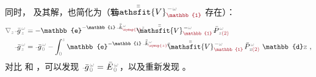 同时， 及其解，也简化为（若 $\Xint{\mathcolor{gray}{-}}{25}{\bar{\bar{\mathsfit{V}}}}^{\;\! - \mathcolor{gray}{\omega}}_{\textcolor{Maroon}{\mathbb{1}}}$ 存在）：
\begin{subequations} \label{eq:simplify6-LE0-SVA-E'-V_1nonsingular-gg}
\begin{align}
	\mathcolor{gray}{\nabla_z} \Xint{{}^{}_{\mathcolor{gray}{-}}}{10}{\bar{g}}^{\;\!\mathcolor{gray}{\omega}}_{\;\! \mathcolor{gray}{z}}
	&= - \mathbb{e}^{-\mathbb{i} \Xint{\begin{smallmatrix} ~ \\ {}^{}_{\mathcolor{gray}{-}} \\ ~ \end{smallmatrix}}{15}{\bar{\bar{k}}}_{\textcolor{Maroon}{\symup{z}}}^{\;\! \mathcolor{gray}{\omega}} \mathcolor{gray}{z}} \Xint{\mathcolor{gray}{-}}{25}{\bar{\bar{\mathsfit{V}}}}^{\;\! - \mathcolor{gray}{\omega}}_{\textcolor{Maroon}{\mathbb{1}}} \Xint{\mathcolor{gray}{-}}{30}{\bar{P}}^{\;\! \mathcolor{gray}{\omega}}_{\;\! \mathcolor{gray}{z} \textcolor{Maroon}{(2)}} \label{eq:simplify6-LE0-SVA-E'-V_1nonsingular-g} \\
	\Xint{{}^{}_{\mathcolor{gray}{-}}}{10}{\bar{g}}^{\;\!\mathcolor{gray}{\omega}}_{\;\! \mathcolor{gray}{z}}
	&= \Xint{{}^{}_{\mathcolor{gray}{-}}}{10}{\bar{g}}^{\;\!\mathcolor{gray}{\omega}}_{\;\! \mathcolor{gray}{0}} - \int_{\mathcolor{gray}{0}}^{\mathcolor{gray}{z}} \mathbb{e}^{- \mathbb{i} \Xint{\begin{smallmatrix} ~ \\ {}^{}_{\mathcolor{gray}{-}} \\ ~ \end{smallmatrix}}{15}{\bar{\bar{k}}}_{\textcolor{Maroon}{\symup{z}}}^{\;\! \mathcolor{gray}{\omega}} \mathcolor{gray}{\mathtt{z}}} \cdot \Xint{\mathcolor{gray}{-}}{25}{\bar{\bar{\mathsfit{V}}}}^{\;\! - \mathcolor{gray}{\omega}}_{\textcolor{Maroon}{\mathbb{1}}} \Xint{\mathcolor{gray}{-}}{30}{\bar{P}}^{\;\! \mathcolor{gray}{\omega}}_{\;\! \mathcolor{gray}{\mathtt{z}} \textcolor{Maroon}{(2)}} ~\mathbb{d} \mathcolor{gray}{\mathtt{z}} ~,  \label{eq:simplify6-LE0-SVA-E'-V_1nonsingular-solution-g}
\end{align}
\end{subequations}
对比  和 ，可以发现 $\Xint{{}^{}_{\mathcolor{gray}{-}}}{10}{\bar{g}}^{\;\!\mathcolor{gray}{\omega}}_{\;\! \mathcolor{gray}{0}} = \Xint{\mathcolor{gray}{-}}{295}{\bar{E}}^{\;\!\mathcolor{gray}{\omega}}_{\;\! \mathcolor{gray}{0}}$，以及重新发现 。

